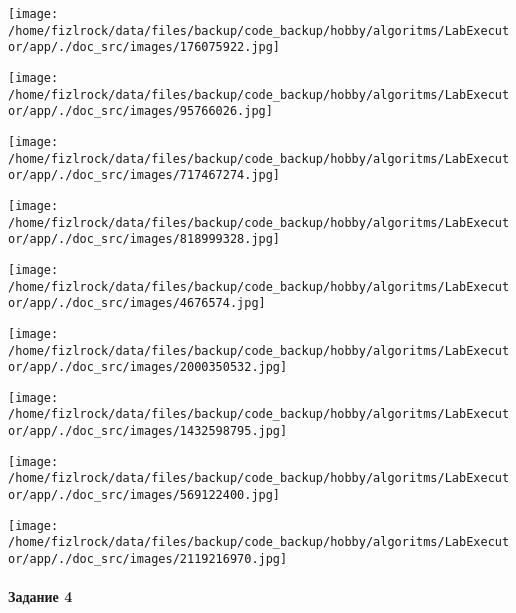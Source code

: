 \documentclass[a4paper, 12pt]{article}
\begin{document}
\texttt{[image: /home/fizlrock/data/files/backup/code\_backup/hobby/algoritms/LabExecutor/app/./doc\_src/images/176075922.jpg]}

\texttt{[image: /home/fizlrock/data/files/backup/code\_backup/hobby/algoritms/LabExecutor/app/./doc\_src/images/95766026.jpg]}

\texttt{[image: /home/fizlrock/data/files/backup/code\_backup/hobby/algoritms/LabExecutor/app/./doc\_src/images/717467274.jpg]}

\texttt{[image: /home/fizlrock/data/files/backup/code\_backup/hobby/algoritms/LabExecutor/app/./doc\_src/images/818999328.jpg]}

\texttt{[image: /home/fizlrock/data/files/backup/code\_backup/hobby/algoritms/LabExecutor/app/./doc\_src/images/4676574.jpg]}

\texttt{[image: /home/fizlrock/data/files/backup/code\_backup/hobby/algoritms/LabExecutor/app/./doc\_src/images/2000350532.jpg]}

\texttt{[image: /home/fizlrock/data/files/backup/code\_backup/hobby/algoritms/LabExecutor/app/./doc\_src/images/1432598795.jpg]}

\texttt{[image: /home/fizlrock/data/files/backup/code\_backup/hobby/algoritms/LabExecutor/app/./doc\_src/images/569122400.jpg]}

\texttt{[image: /home/fizlrock/data/files/backup/code\_backup/hobby/algoritms/LabExecutor/app/./doc\_src/images/2119216970.jpg]}
\pagebreak
\paragraph{Задание 4}
\end{document}
